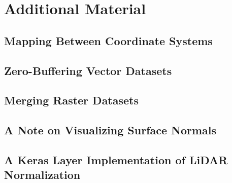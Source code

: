 \chapter{Additional Material}
\label{app:additional}

\section{Mapping Between Coordinate Systems}

\section{Zero-Buffering Vector Datasets}

\section{Merging Raster Datasets}

\section{A Note on Visualizing Surface Normals}


\section{A Keras Layer Implementation of LiDAR Normalization}
